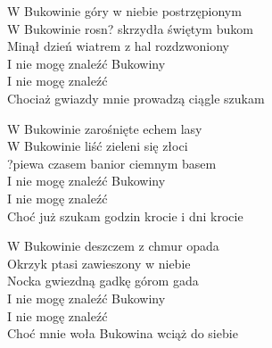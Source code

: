 
\begin{text}
    W Bukowinie góry w niebie postrzępionym\\
    W Bukowinie rosn? skrzydła świętym bukom\\
    Minął dzień wiatrem z hal rozdzwoniony\\
    I nie mogę znaleźć Bukowiny\\
    I nie mogę znaleźć\\
    Chociaż gwiazdy mnie prowadzą ciągle szukam

    W Bukowinie zarośnięte echem lasy\\
    W Bukowinie liść zieleni się złoci\\
    ?piewa czasem banior ciemnym basem\\
    I nie mogę znaleźć Bukowiny\\
    I nie mogę znaleźć\\
    Choć już szukam godzin krocie i dni krocie

    W Bukowinie deszczem z chmur opada\\
    Okrzyk ptasi zawieszony w niebie\\
    Nocka gwiezdną gadkę górom gada\\
    I nie mogę znaleźć Bukowiny\\
    I nie mogę znaleźć\\
    Choć mnie woła Bukowina wciąż do siebie
\end{text}
\begin{chord}

\end{chord}